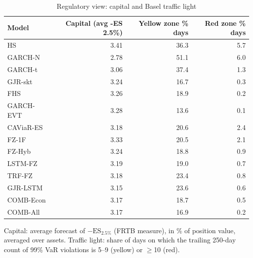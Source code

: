 \begin{table}[htbp]
\centering
\footnotesize
\caption{Regulatory view: capital and Basel traffic light}
\label{tab:reg}
\begin{tabular}{lrrr}
\toprule
Model & Capital (avg -ES 2.5\%) & Yellow zone \% days & Red zone \% days \\
\midrule
HS & 3.41 & 36.3 & 5.7 \\
GARCH-N & 2.78 & 51.1 & 6.0 \\
GARCH-t & 3.06 & 37.4 & 1.3 \\
GJR-skt & 3.24 & 16.7 & 0.3 \\
FHS & 3.26 & 18.9 & 0.2 \\
GARCH-EVT & 3.28 & 13.6 & 0.1 \\
CAViaR-ES & 3.18 & 20.6 & 2.4 \\
FZ-1F & 3.33 & 20.5 & 2.1 \\
FZ-Hyb & 3.24 & 18.8 & 0.9 \\
LSTM-FZ & 3.19 & 19.0 & 0.7 \\
TRF-FZ & 3.18 & 23.4 & 0.8 \\
GJR-LSTM & 3.15 & 23.6 & 0.6 \\
COMB-Econ & 3.17 & 18.7 & 0.5 \\
COMB-All & 3.17 & 16.9 & 0.2 \\
\bottomrule
\end{tabular}
\par\smallskip\parbox{\linewidth}{\scriptsize Capital: average forecast of $-\mathrm{ES}_{2.5\%}$ (FRTB measure), in \% of position value, averaged over assets. Traffic light: share of days on which the trailing 250-day count of 99\% VaR violations is 5--9 (yellow) or $\geq$10 (red).}
\end{table}
